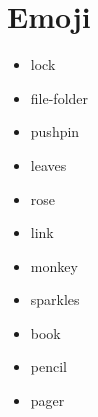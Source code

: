 \documentclass[12pt]{article}
\begin{document}
\section{Emoji }%
\label{sec:Emoji}

\begin{itemize}
	\item lock 
	\item file-folder  
	\item pushpin  
	\item leaves 
	\item rose 
	\item link 
	\item monkey 
	\item sparkles 
	\item book 
	\item pencil 
	\item pager 
\end{itemize}
\end{document}
